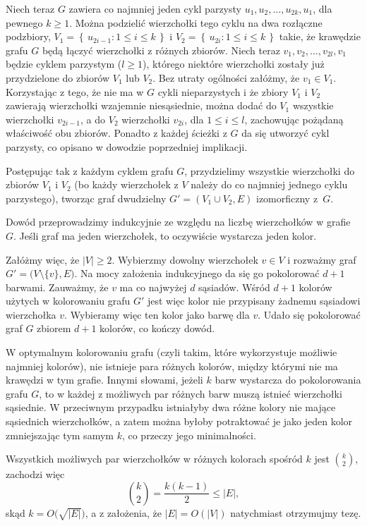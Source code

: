 Niech teraz $G$ zawiera co najmniej jeden cykl parzysty $u_1,u_2,\dots,u_{2k},u_1$, dla pewnego $k\ge1$. Można podzielić wierzchołki tego cyklu na dwa rozłączne podzbiory, $V_1=\left\{\,u_{2i-1}:1\le i\le k\,\right\}$ i $V_2=\left\{\,u_{2i}:1\le i\le k\,\right\}$ takie, że krawędzie grafu $G$ będą łączyć wierzchołki z różnych zbiorów. Niech teraz $v_1,v_2,\dots,v_{2l},v_1$ będzie cyklem parzystym ($l\ge1$), którego niektóre wierzchołki zostały już przydzielone do zbiorów $V_1$ lub $V_2$. Bez utraty ogólności załóżmy, że $v_1\in V_1$. Korzystając z tego, że nie ma w $G$ cykli nieparzystych i że zbiory $V_1$ i $V_2$ zawierają wierzchołki wzajemnie niesąsiednie, można dodać do $V_1$ wszystkie wierzchołki $v_{2i-1}$, a do $V_2$ wierzchołki $v_{2i}$, dla $1\le i\le l$, zachowując pożądaną właściwość obu zbiorów. Ponadto z każdej ścieżki z $G$ da się utworzyć cykl parzysty, co opisano w dowodzie poprzedniej implikacji.

Postępując tak z każdym cyklem grafu $G$, przydzielimy wszystkie wierzchołki do zbiorów $V_1$ i $V_2$ (bo każdy wierzchołek z $V$ należy do co najmniej jednego cyklu parzystego), tworząc graf dwudzielny $G'=(V_1\cup V_2,E)$ izomorficzny z~$G$.

\subproblem %
Dowód przeprowadzimy indukcyjnie ze względu na liczbę wierzchołków w grafie $G$. Jeśli graf ma jeden wierzchołek, to oczywiście wystarcza jeden kolor.

Załóżmy więc, że $|V|\ge2$. Wybierzmy dowolny wierzchołek $v\in V$ i rozważmy graf $G'=\bigl(V\setminus\{v\},E\bigr)$. Na mocy założenia indukcyjnego da się go pokolorować $d+1$ barwami. Zauważmy, że $v$ ma co najwyżej $d$ sąsiadów. Wśród $d+1$ kolorów użytych w kolorowaniu grafu $G'$ jest więc kolor nie przypisany żadnemu sąsiadowi wierzchołka $v$. Wybieramy więc ten kolor jako barwę dla $v$. Udało się pokolorować graf $G$ zbiorem $d+1$ kolorów, co kończy dowód.

\subproblem %
W optymalnym kolorowaniu grafu (czyli takim, które wykorzystuje możliwie najmniej kolorów), nie istnieje para różnych kolorów, między którymi nie ma krawędzi w tym grafie. Innymi słowami, jeżeli $k$ barw wystarcza do pokolorowania grafu $G$, to w każdej z możliwych par różnych barw muszą istnieć wierzchołki sąsiednie. W przeciwnym przypadku istniałyby dwa różne kolory nie mające sąsiednich wierzchołków, a zatem można byłoby potraktować je jako jeden kolor zmniejszając tym samym $k$, co przeczy jego minimalności.

Wszystkich możliwych par wierzchołków w różnych kolorach spośród $k$ jest $\binom{k}{2}$, zachodzi więc
\[
    \binom{k}{2} = \frac{k(k-1)}{2} \le |E|,
\]
skąd $k=O\bigl(\!\sqrt{|E|}\bigr)$, a z założenia, że $|E|=O(|V|)$ natychmiast otrzymujmy tezę.

